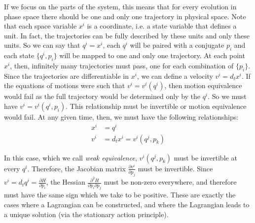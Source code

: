 \documentclass[letterpaper]{article}
\begin{document}
If we focus on the parts of the system, this means that for every evolution in phase space there should be one and only one trajectory in physical space. Note that each space variable $x^i$ is a coordinate, i.e. a state variable that defines a unit. In fact, the trajectories can be fully described by these units and only these units. So we can say that $q^i=x^i$, each $q^i$ will be paired with a conjugate $p_i$ and each state $\{q^i, p_i\}$ will be mapped to one and only one trajectory. At each point $x^i$, then, infinitely many trajectories must pass, one for each combination of $\{p_i\}$. Since the trajectories are differentiable in $x^i$, we can define a velocity $v^i = d_t x^i$. If the equations of motions were such that $v^i=v^i(q^i)$, then motion equivalence would fail as the full trajectory would be determined only by the $q^i$. So we must have $v^i=v^i(q^i, p_i)$. This relationship must be invertible or motion equivalence would fail. At any given time, then, we must have the following relationships:
\begin{equation}
\begin{aligned}
x^i &= q^i \\
v^i &= d_t x^i = v^i(q^j, p_k)
\end{aligned}
\end{equation}

In this case, which we call \textit{weak equivalence}, $v^i(q^j, p_k)$ must be invertible at every $q^i$. Therefore, the Jacobian matrix  $\frac{\partial v^i}{\partial p_j}$ must be invertible. Since $v^i = d_t q^i = \frac{\partial H}{\partial p_i}$, the Hessian $\frac{\partial^2 H}{\partial p_i \partial p_j}$ must be non-zero everywhere, and therefore must have the same sign which we take to be positive. These are exactly the cases where a Lagrangian can be constructed, and where the Lagrangian leads to a unique solution (via the stationary action principle).
\end{document}
